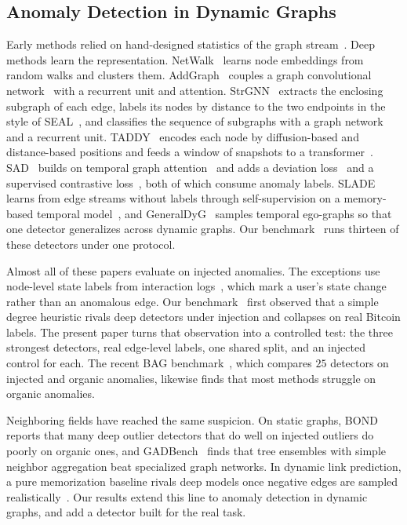 \documentclass[pdflatex,sn-basic]{sn-jnl}
\theoremstyle{definition}
\theoremstyle{plain}
\begin{document}
\subsection{Anomaly Detection in Dynamic Graphs}
Early methods relied on hand-designed statistics of the graph
stream~\cite{akoglu2015,ranshous2015}. Deep methods learn the representation.
NetWalk~\cite{netwalk} learns node embeddings from random walks and clusters
them. AddGraph~\cite{addgraph} couples a graph convolutional
network~\cite{gcn} with a recurrent unit and attention. StrGNN~\cite{strgnn}
extracts the enclosing subgraph of each edge, labels its nodes by distance to
the two endpoints in the style of SEAL~\cite{seal}, and classifies the sequence
of subgraphs with a graph network~\cite{dgcnn} and a recurrent unit.
TADDY~\cite{taddy} encodes each node by diffusion-based and distance-based
positions and feeds a window of snapshots to a
transformer~\cite{vaswani2017}. SAD~\cite{sad} builds on temporal graph
attention~\cite{tgat} and adds a deviation loss~\cite{devnet} and a supervised
contrastive loss~\cite{supcon}, both of which consume anomaly labels.
SLADE~\cite{slade} learns from edge streams without labels through
self-supervision on a memory-based temporal model~\cite{tgn}, and
GeneralDyG~\cite{yang2025generaldyg} samples temporal ego-graphs so that one
detector generalizes across dynamic graphs. Our benchmark~\cite{nekka_survey} runs thirteen of these detectors under one
protocol.

Almost all of these papers evaluate on injected anomalies. The exceptions use
node-level state labels from interaction logs~\cite{jodie}, which mark a user's
state change rather than an anomalous edge. Our benchmark~\cite{nekka_survey}
first observed that a simple degree heuristic rivals deep detectors under
injection and collapses on real Bitcoin labels. The present paper turns that
observation into a controlled test: the three strongest detectors, real
edge-level labels, one shared split, and an injected control for each. The
recent BAG benchmark~\cite{hua2026bag}, which compares $25$ detectors on
injected and organic anomalies, likewise finds that most methods struggle on
organic anomalies.

Neighboring fields have reached the same suspicion. On static graphs,
BOND~\cite{bond} reports that many deep outlier detectors that do well on
injected outliers do poorly on organic ones, and GADBench~\cite{gadbench}
finds that tree ensembles with simple neighbor aggregation beat specialized
graph networks. In dynamic link prediction, a pure memorization baseline
rivals deep models once negative edges are sampled
realistically~\cite{poursafaei2022}. Our results extend this line to anomaly
detection in dynamic graphs, and add a detector built for the real task.
\end{document}
